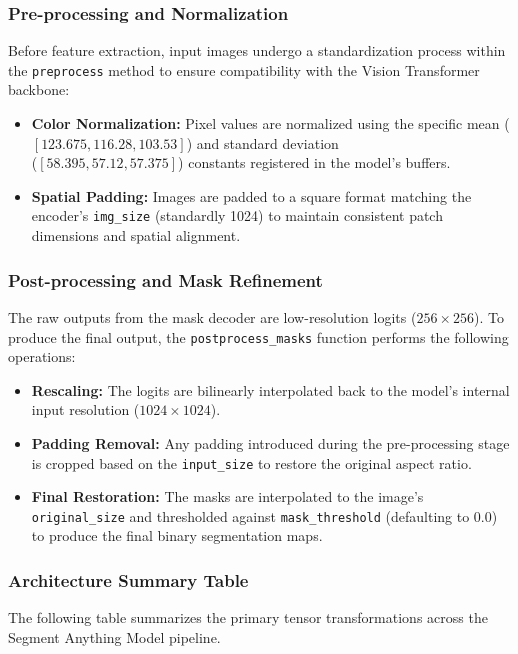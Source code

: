 \subsubsection{Pre-processing and Normalization}
Before feature extraction, input images undergo a standardization process within the \texttt{preprocess} method to ensure compatibility with the Vision Transformer backbone:
\begin{itemize}
	\item \textbf{Color Normalization:} Pixel values are normalized using the specific mean ($[123.675, 116.28, 103.53]$) and standard deviation\\ ($[58.395, 57.12, 57.375]$) constants registered in the model's buffers.
	\item \textbf{Spatial Padding:} Images are padded to a square format matching the encoder's \texttt{img\_size} (standardly 1024) to maintain consistent patch dimensions and spatial alignment.
\end{itemize}

\subsubsection{Post-processing and Mask Refinement}
The raw outputs from the mask decoder are low-resolution logits ($256 \times 256$). To produce the final output, the \texttt{postprocess\_masks} function performs the following operations:
\begin{itemize}
	\item \textbf{Rescaling:} The logits are bilinearly interpolated back to the model's internal input resolution ($1024 \times 1024$).
	\item \textbf{Padding Removal:} Any padding introduced during the pre-processing stage is cropped based on the \texttt{input\_size} to restore the original aspect ratio.
	\item \textbf{Final Restoration:} The masks are interpolated to the image's \texttt{original\_size} and thresholded against \texttt{mask\_threshold} (defaulting to $0.0$) to produce the final binary segmentation maps.
\end{itemize}

\subsubsection{Architecture Summary Table}
The following table summarizes the primary tensor transformations across the Segment Anything Model pipeline.

